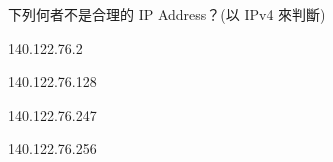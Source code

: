 \ifx\ntpcNinetyThree\undefined[93學年基北區] \fi
下列何者不是合理的 IP Address？(以 IPv4 來判斷)
  \begin{optionlist}
  \item 140.122.76.2
  \item 140.122.76.128
  \item 140.122.76.247
  \item 140.122.76.256\label{ntpc-93-a24}
  \end{optionlist}